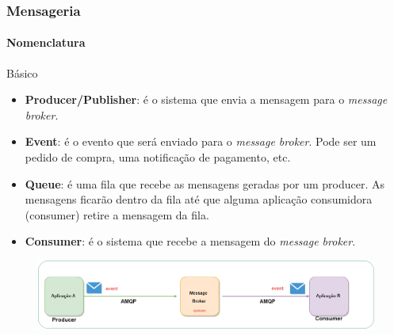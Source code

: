 \documentclass[
	9pt, %
	t, %
]{beamer}
\begin{document}
\begin{frame}
	\frametitle{Mensageria}
	\framesubtitle{Nomenclatura}
	
	\begin{block}{Básico}
		\begin{itemize}
			\item \textbf{Producer/Publisher}: é o sistema que envia a mensagem para o \textit{message broker}.
			\item \textbf{Event}: é o evento que será enviado para o \textit{message broker}. Pode ser um pedido de compra, uma notificação de pagamento, etc.
			\item \textbf{Queue}: é uma fila que recebe as mensagens geradas por um producer. As mensagens ficarão dentro da fila até que alguma aplicação consumidora (consumer) retire a mensagem da fila.
			\item \textbf{Consumer}: é o sistema que recebe a mensagem do \textit{message broker}.
		\end{itemize}
	\end{block}

	\begin{figure}
		\centering
		\includegraphics[width=0.9\linewidth]{Images/message_broker.png}
	\end{figure}


\end{frame}
\end{document}
